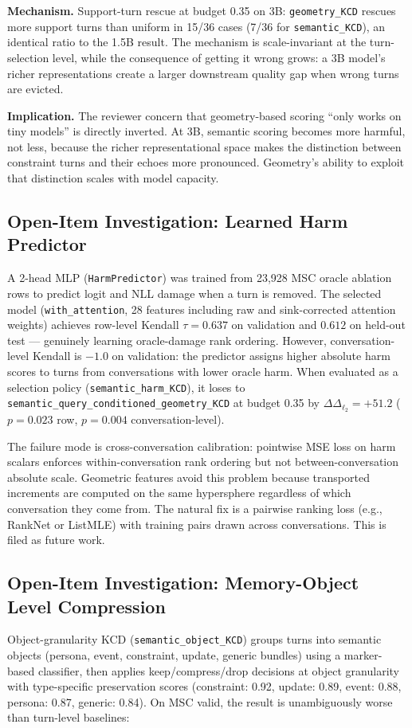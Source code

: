 \documentclass[conference]{IEEEtran}
\newcommand{\Logit}{\Delta_{\ell_2}}
\begin{document}
\textbf{Mechanism.} Support-turn rescue at budget 0.35 on 3B: \texttt{geometry\_KCD} rescues more support turns than uniform in 15/36 cases (7/36 for \texttt{semantic\_KCD}), an identical ratio to the 1.5B result. The mechanism is scale-invariant at the turn-selection level, while the consequence of getting it wrong grows: a 3B model's richer representations create a larger downstream quality gap when wrong turns are evicted.

\textbf{Implication.} The reviewer concern that geometry-based scoring ``only works on tiny models'' is directly inverted. At 3B, semantic scoring becomes more harmful, not less, because the richer representational space makes the distinction between constraint turns and their echoes more pronounced. Geometry's ability to exploit that distinction scales with model capacity.

\subsection{Open-Item Investigation: Learned Harm Predictor}
\label{sec:harm_predictor}
A 2-head MLP (\texttt{HarmPredictor}) was trained from 23{,}928 MSC oracle ablation rows to predict logit and NLL damage when a turn is removed. The selected model (\texttt{with\_attention}, 28 features including raw and sink-corrected attention weights) achieves row-level Kendall $\tau = 0.637$ on validation and $0.612$ on held-out test --- genuinely learning oracle-damage rank ordering. However, conversation-level Kendall is $-1.0$ on validation: the predictor assigns higher absolute harm scores to turns from conversations with lower oracle harm. When evaluated as a selection policy (\texttt{semantic\_harm\_KCD}), it loses to \texttt{semantic\_query\_conditioned\_geometry\_KCD} at budget 0.35 by $\Delta\Logit = +51.2$ ($p=0.023$ row, $p=0.004$ conversation-level).

The failure mode is cross-conversation calibration: pointwise MSE loss on harm scalars enforces within-conversation rank ordering but not between-conversation absolute scale. Geometric features avoid this problem because transported increments are computed on the same hypersphere regardless of which conversation they come from. The natural fix is a pairwise ranking loss (e.g., RankNet or ListMLE) with training pairs drawn across conversations. This is filed as future work.

\subsection{Open-Item Investigation: Memory-Object Level Compression}
\label{sec:object_compression}
Object-granularity KCD (\texttt{semantic\_object\_KCD}) groups turns into semantic objects (persona, event, constraint, update, generic bundles) using a marker-based classifier, then applies keep/compress/drop decisions at object granularity with type-specific preservation scores (constraint: 0.92, update: 0.89, event: 0.88, persona: 0.87, generic: 0.84). On MSC valid, the result is unambiguously worse than turn-level baselines:
\end{document}
